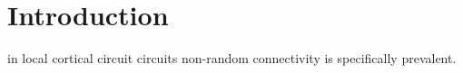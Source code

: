
\section*{Introduction}

in local cortical circuit circuits non-random connectivity is specifically prevalent. 
